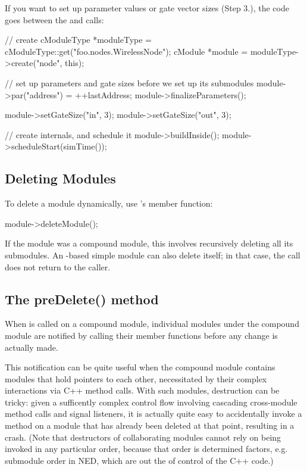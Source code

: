 If you want to set up parameter values or gate vector sizes (Step 3.),
the code goes between the  and
 calls:

\begin{cpp}
// create
cModuleType *moduleType = cModuleType::get("foo.nodes.WirelessNode");
cModule *module = moduleType->create("node", this);

// set up parameters and gate sizes before we set up its submodules
module->par("address") = ++lastAddress;
module->finalizeParameters();

module->setGateSize("in", 3);
module->setGateSize("out", 3);

// create internals, and schedule it
module->buildInside();
module->scheduleStart(simTime());
\end{cpp}


\subsection{Deleting Modules}
\label{sec:simple-modules:deleting-modules}

To delete a module dynamically, use
's  member function:

\begin{cpp}
module->deleteModule();
\end{cpp}

If the module was a compound module, this involves recursively
deleting all its submodules. An -based simple module
can also delete itself; in that case, the  call
does not return to the caller.


\subsection{The preDelete() method}
\label{sec:simple-modules:predelete}

When  is called on a compound module, individual modules
under the compound module are notified by calling their 
member functions before any change is actually made.

This notification can be quite useful when the compound module contains modules
that hold pointers to each other, necessitated by their complex interactions via
C++ method calls. With such modules, destruction can be tricky: given a
sufficently complex control flow involving cascading cross-module method calls
and signal listeners, it is actually quite easy to accidentally invoke a method
on a module that has already been deleted at that point, resulting in a crash.
(Note that destructors of collaborating modules cannot rely on being invoked in
any particular order, because that order is determined factors, e.g. submodule
order in NED, which are out the of control of the C++ code.)

